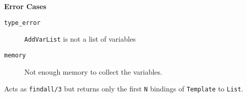 \begin{description}
{\bf Error Cases}
    \begin{description}
    \item[{\tt type\_error}]
	{\tt AddVarList} is not a list of variables
     \item[{\tt memory}]
	Not enough memory to collect the variables.
    \end{description}

%
Acts as {\tt findall/3} but returns only the first {\tt N} bindings of
{\tt Template} to {\tt List}.

\end{description}

%


